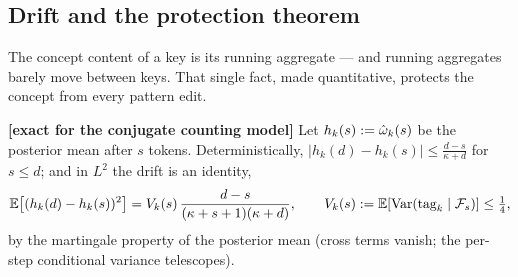 \documentclass{article}
\begin{document}
\subsection{Drift and the protection theorem}

The concept content of a key is its running aggregate --- and running aggregates barely move between keys. That single fact, made quantitative, protects the concept from every pattern edit.

\begin{lemma}\label{lem:drift}
\textbf{[exact for the conjugate counting model]} Let $h_k(s) := \hat{\omega}_k(s)$ be the posterior mean after $s$ tokens. Deterministically, $|h_k(d) - h_k(s)| \le \frac{d - s}{\kappa + d}$ for $s \le d$; and in $L^2$ the drift is an identity,
\begin{equation}
    \mathbb{E}\big[(h_k(d) - h_k(s))^2\big] = V_k(s)\,\frac{d - s}{(\kappa + s + 1)(\kappa + d)} , \qquad V_k(s) := \mathbb{E}[\operatorname{Var}(\text{tag}_k \mid \mathcal{F}_s)] \le \tfrac14 ,
\end{equation}
by the martingale property of the posterior mean (cross terms vanish; the per-step conditional variance telescopes).
\end{lemma}
\end{document}
